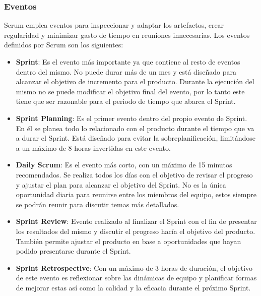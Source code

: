 \subsubsection{Eventos}
Scrum emplea eventos para inspeccionar y adaptar los artefactos, crear regularidad y minimizar gasto de tiempo en reuniones innecesarias. Los eventos definidos por Scrum son los siguientes:
\begin{itemize}
	\item \textbf{Sprint}: Es el evento más importante ya que contiene al resto de eventos dentro del mismo. No puede durar más de un mes y está diseñado para alcanzar el objetivo de incremento para el producto. Durante la ejecución del mismo no se puede modificar el objetivo final del evento, por lo tanto este tiene que ser razonable para el periodo de tiempo que abarca el Sprint.
	\item \textbf{Sprint Planning}: Es el primer evento dentro del propio evento de Sprint. En él se planea todo lo relacionado con el producto durante el tiempo que va a durar el Sprint. Está diseñado para evitar la sobreplanificación, limitándose a un máximo de 8 horas invertidas en este evento.
	\item \textbf{Daily Scrum}: Es el evento más corto, con un máximo de 15 minutos recomendados. Se realiza todos los días con el objetivo de revisar el progreso y ajustar el plan para alcanzar el objetivo del Sprint. No es la única oportunidad diaria para reunirse entre los miembros del equipo, estos siempre se podrán reunir para discutir temas más detallados.
	\item \textbf{Sprint Review}: Evento realizado al finalizar el Sprint con el fin de presentar los resultados del mismo y discutir el progreso hacía el objetivo del producto. También permite ajustar el producto en base a oportunidades que hayan podido presentarse durante el Sprint.
	\item \textbf{Sprint Retrospective}: Con un máximo de 3 horas de duración, el objetivo de este evento es reflexionar sobre las dinámicas de equipo y planificar formas de mejorar estas así como la calidad y la eficacia durante el próximo Sprint.
\end{itemize}

